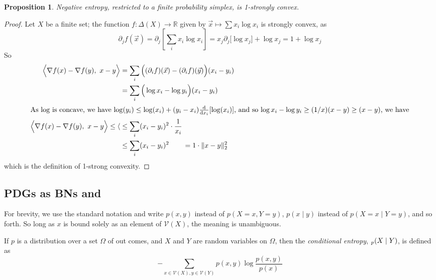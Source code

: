 \documentclass{article}
\theoremstyle{plain}
\newtheorem{prop}[theorem]{Proposition}
\theoremstyle{definition}
\theoremstyle{remark}
\DeclarePairedDelimiter{\norm}{\lVert}{\rVert}
\let\H\relax
\DeclareMathOperator{\H}{\mathrm{H}} %
\newcommand{\V}{\mathcal V}
\numberwithin{equation}{section}
\begin{document}
	\begin{prop}\label{prop:neg-ent-convex}
		Negative entropy, restricted to a finite probability simplex, is 1-strongly convex.
	\end{prop}
	\begin{proof}
		Let $X$ be a finite set; the function $f: \Delta(X) \to \mathbb R$ given by $\vec x \mapsto \sum x_i \log x_i$ is strongly convex, as 
		\begin{equation*}
			\partial_j f(\vec x) =  \partial_j\left[\sum_i x_i \log x_i \right] = 
				x_j \partial_j \big[\log x_j \big] + \log x_j = 1 + \log x_j
		\end{equation*}
		So
		\begin{align*}
			\Big\langle \nabla f(x) - \nabla f(y),~ x-y\Big\rangle 
				&= \sum_i \Big((\partial_i f)(\vec x) - (\partial_i f)(\vec y)\Big)(x_i - y_i) \\
				&= \sum_i \Big(\log x_i  - \log y_i \Big)(x_i - y_i) \\
			\intertext{As $\log$ is concave, we have $\log(y_i) \leq \log(x_i) + (y_i-x_i) \frac{\mathrm d}{\mathrm d x_i} [\log(x_i)]$, and so $\log x_i - \log y_i \geq (1/x) (x - y)  \geq (x-y)$, we have}
			\Big\langle \nabla f(x) - \nabla f(y),~ x-y\Big\rangle \leq \langle
			 	&\leq \sum_i (x_i-y_i)^2 \cdot \frac1{x_i}\\
			 	&\leq \sum_i (x_i-y_i)^2 
			 	\qquad= 1 \cdot \norm{x-y}^2_2 
		\end{align*}
		which is the definition of 1-strong convexity.
	\end{proof}
\subsection{PDGs as BNs and }

For brevity, we use the standard notation and write $p(x, y)$ instead of $p(X \!=\! x, Y \!=\! y)$, $p(x \mid y)$ instead of $p(X \!=\! x\mid Y \!=\! y)$, and so forth. So long as $x$ is bound solely as an element of $\V(X)$, the meaning is unambiguous. 


\begin{defn}
	If $p$ is a distribution over a set $\Omega$ of out comes, and $X$ and $Y$ are random variables on $\Omega$, then the \emph{conditional entropy}, $\H_p(X \mid Y)$, is defined as 
	\[ - \sum_{x \in \V(X), y \in \V(Y)} p(x,y) \log \frac{p(x,y)}{p(x)} \]
\end{defn}
\end{document}
